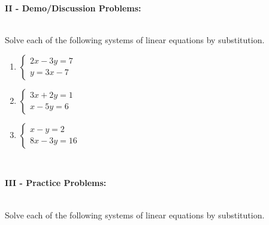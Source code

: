 \documentclass[12pt]{article}
\theoremstyle{definition}
\begin{document}
{\bf II - Demo/Discussion Problems:}\\
\ \par
Solve each of the following systems of linear equations by substitution.
\begin{multicols}{3}
	\begin{enumerate}
		\item $\begin{cases}
					2x-3y=7\\
			    y=3x-7
					\end{cases}$
		\item $\begin{cases}
					3x+2y=1\\
					x-5y=6
					\end{cases}$
		\item $\begin{cases}
			    x-y=2\\
				  8x-3y=16
					\end{cases}$
	\end{enumerate}
\end{multicols}
\ \par
{\bf III - Practice Problems:}\\
\ \par
Solve each of the following systems of linear equations by substitution.
\end{document}
